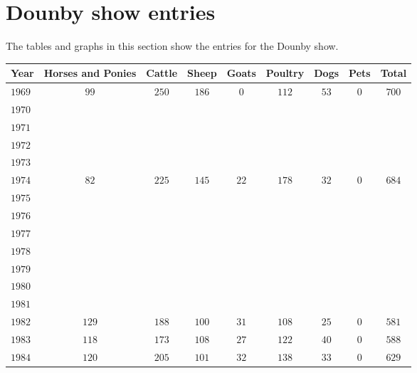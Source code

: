 \section*{Dounby show entries}
The tables and graphs in this section show the entries for the Dounby show.


\begin{longtable}{|l|cccccccc|}
\hline
    \textbf{Year} &
    \textbf{Horses and Ponies} &
    \textbf{Cattle} &
    \textbf{Sheep} &
    \textbf{Goats} &
    \textbf{Poultry} &
    \textbf{Dogs} &
    \textbf{Pets} &
    \textbf{Total}    
    \\
\hline
\endhead
\hline
\endfoot
    $1969$  & $99$  & $250$ & $186$ & $0$   & $112$ & $53$  & $0$   & $700$ \\
    $1970$  &       &       &       &       &       &       &       &       \\
    $1971$  &       &       &       &       &       &       &       &       \\
    $1972$  &       &       &       &       &       &       &       &       \\
    $1973$  &       &       &       &       &       &       &       &       \\
    $1974$  & $82$  & $225$ & $145$ & $22$  & $178$ & $32$  & $0$   & $684$ \\
    $1975$  &       &       &       &       &       &       &       &       \\
    $1976$  &       &       &       &       &       &       &       &       \\
    $1977$  &       &       &       &       &       &       &       &       \\
    $1978$  &       &       &       &       &       &       &       &       \\
    $1979$  &       &       &       &       &       &       &       &       \\
    $1980$  &       &       &       &       &       &       &       &       \\
    $1981$  &       &       &       &       &       &       &       &       \\
    $1982$  & $129$ & $188$ & $100$ & $31$  & $108$ & $25$  & $0$   & $581$ \\
    $1983$  & $118$ & $173$ & $108$ & $27$  & $122$ & $40$  & $0$   & $588$ \\
    $1984$  & $120$ & $205$ & $101$ & $32$  & $138$ & $33$  & $0$   & $629$ \\

\end{longtable}
